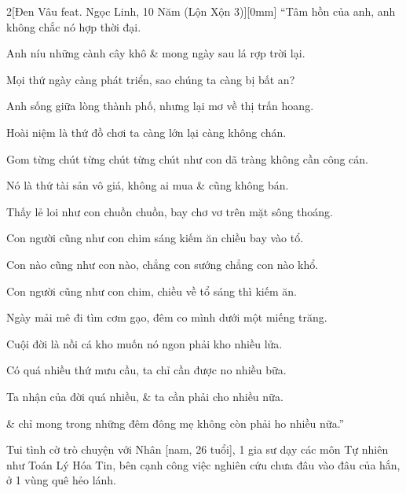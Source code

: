 \documentclass[12pt]{article}
\begin{document}
\begin{multicols}{2}[{\sc Đen Vâu} feat. {\sc Ngọc Linh}, 10 Năm (Lộn Xộn 3)][0mm]
	``Tâm hồn của anh, anh không chắc nó hợp thời đại.
	
	Anh níu những cành cây khô \& mong ngày sau lá rợp trời lại.
	
	Mọi thứ ngày càng phát triển, sao chúng ta càng bị bất an?
	
	Anh sống giữa lòng thành phố, nhưng lại mơ về thị trấn hoang.
	
	Hoài niệm là thứ đồ chơi ta càng lớn lại càng không chán.
	
	Gom từng chút từng chút từng chút như con dã tràng không cần công cán.
	
	Nó là thứ tài sản vô giá, không ai mua \& cũng không bán.
	
	Thấy lẻ loi như con chuồn chuồn, bay chơ vơ trên mặt sông thoáng.
	
	Con người cũng như con chim sáng kiếm ăn chiều bay vào tổ.
	
	Con nào cũng như con nào, chẳng con sướng chẳng con nào khổ.
	
	Con người cũng như con chim, chiều về tổ sáng thì kiếm ăn.
	
	Ngày mải mê đi tìm cơm gạo, đêm co mình dưới một miếng trăng.
	
	Cuội đời là nồi cá kho muốn nó ngon phải kho nhiều lửa.
	
	Có quá nhiều thứ mưu cầu, ta chỉ cần được no nhiều bữa.
	
	Ta nhận của đời quá nhiều, \& ta cần phải cho nhiều nữa.
	
	\& chỉ mong trong những đêm đông mẹ không còn phải ho nhiều nữa.''
\end{multicols}
Tui tình cờ trò chuyện với Nhân [nam, 26 tuổi], 1 gia sư dạy các môn Tự nhiên như Toán Lý Hóa Tin, bên cạnh công việc nghiên cứu chưa đâu vào đâu của hắn, ở 1 vùng quê hẻo lánh.
\end{document}
